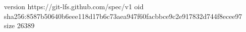 version https://git-lfs.github.com/spec/v1
oid sha256:8587b50640b6eee118d17b6c73aea947f60facbbce9c2e917832d744f8ecee97
size 26389

